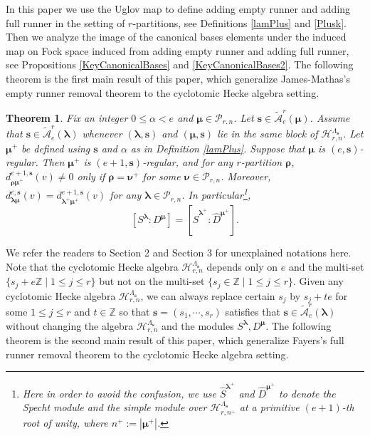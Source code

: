 \documentclass[a4paper,10pt]{amsart}
\theoremstyle{plain}
\renewcommand{\H}{\mathcal{H}}
\def\bs{{\boldsymbol{s}}}
\def\Z{{\mathbb Z}}
\def\Lam{\Lambda}
\def\PP{\mathscr{P}}
\def\blam{{\boldsymbol \lambda}}
\def\bmu{{\boldsymbol \mu}}
\def\brho{{\boldsymbol\rho}}
\def\bnu{{\boldsymbol \nu}}
\theoremstyle{plain}
\newtheorem{mainresult}{Theorem}
\numberwithin{equation}{section}
\begin{document}
In this paper we use the Uglov map to define adding empty runner and adding full runner in the setting of $r$-partitions, see Definitions \ref{lamPlus} and \ref{Plusk}. Then we analyze the image of the canonical bases elements under the induced map on Fock space induced from adding empty runner and adding full runner, see Propositions \ref{KeyCanonicalBases} and \ref{KeyCanonicalBases2}. The following theorem is the first main result of this paper, which generalize James-Mathas's empty runner removal theorem to the cyclotomic Hecke algebra setting.

\begin{mainresult}\label{mainthm1} Fix an integer $0 \le \alpha < e$ and $\bmu\in\PP_{r,n}$. Let $\bs\in \tilde{\mathcal A}^r_e(\bmu)$. Assume that $\bs\in \tilde{\mathcal A}^r_e(\blam)$ whenever $(\blam,\bs)$ and $(\bmu,\bs)$ lie in the same block of $\H_{r,n}^{\Lam_\bs}$.  Let $\bmu^{+}$ be defined using $\bs$ and $\alpha$ as in Definition \ref{lamPlus}. Suppose that $\bmu$ is $(e,\bs)$-regular. Then $\bmu^+$ is $(e+1,\bs)$-regular, and for any $r$-partition $\brho$, $d^{e+1,\bs}_{\brho\bmu^{+}}(v)\neq 0$ only if $\brho=\bnu^{+}$ for some $\bnu\in\PP_{r,n}$. Moreover, $d^{e,\bs}_{\blam \bmu}(v)=d^{e+1,\bs}_{\blam^{+}\bmu^{+}}(v)$ for any $\blam\in\PP_{r,n}$. In particular\footnote{Here in order to avoid the confusion, we use $\hat{S}^{\blam^{+}}$ and $\hat{D}^{\bmu^{+}}$ to denote the Specht module and the simple module over $\H_{r,n^+}^{\Lambda_\bs}$ at a primitive $(e+1)$-th root of unity, where $n^+:=|\bmu^+|$.}, $$
[S^\blam : D^\bmu]=[\hat{S}^{\blam^{+}} : \hat{D}^{\bmu^{+}}].
$$
\end{mainresult}
We refer the readers to Section 2 and Section 3 for unexplained notations here. Note that the cyclotomic Hecke algebra $\H_{r,n}^{\Lam_\bs}$ depends only on $e$ and the multi-set $\{s_j+e\Z\mid 1\leq j\leq r\}$ but not on the multi-set $\{s_j\in\Z\mid 1\leq j\leq r\}$. Given any cyclotomic Hecke algebra $\H_{r,n}^{\Lam_\bs}$, we can always replace certain $s_j$ by $s_j+te$ for some $1\leq j\leq r$ and $t\in\Z$ so that $\bs=(s_1,\cdots,s_r)$ satisfies that $\bs\in \tilde{\mathcal A}^r_e(\blam)$ without changing the algebra $\H_{r,n}^{\Lam_\bs}$ and the modules $S^\blam, D^\bmu$. The following theorem is the second main result of this paper, which generalize Fayers's full runner removal theorem to the cyclotomic Hecke algebra setting.
\end{document}
